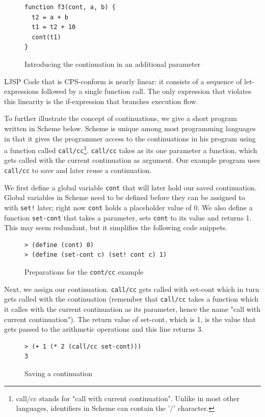 \documentclass[11pt]{report}
\begin{document}
\begin{figure}[ht]
\begin{lstlisting}
function f3(cont, a, b) {
  t2 = a + b
  t1 = t2 + 10
  cont(t1)
}
\end{lstlisting}
\caption{Introducing the continuation in an additional parameter}
\label{cpsconvfunc4}
\end{figure}

LJSP Code that is CPS-conform is nearly linear: it consists of a sequence of let-expressions followed by a single function call. The only expression that violates this linearity is the if-expression that branches execution flow.

To further illustrate the concept of continuations, we give a short program written in Scheme below. Scheme is unique among most programming languages in that it gives the programmer access to the continuations in his program using a function called \texttt{call/cc}\footnote{call/cc stands for "call with current continuation". Unlike in most other languages, identifiers in Scheme can contain the '/' character.}. \texttt{call/cc} takes as its one parameter a function, which gets called with the current continuation as argument. Our example program uses \texttt{call/cc} to save and later reuse a continuation.

We first define a global variable \texttt{cont} that will later hold our saved continuation. Global variables in Scheme need to be defined before they can be assigned to with \texttt{set!} later; right now \texttt{cont} holds a placeholder value of 0. We also define a function \texttt{set-cont} that takes a parameter, sets \texttt{cont} to its value and returns 1. This may seem redundant, but it simplifies the following code snippets.
\begin{figure}[ht]
\begin{lstlisting}
> (define (cont) 0)
> (define (set-cont c) (set! cont c) 1)
\end{lstlisting}
\caption{Preparations for the \texttt{cont/cc} example}
\label{contcc1}
\end{figure}

Next, we assign our continuation. \texttt{call/cc} gets called with set-cont which in turn gets called with the continuation (remember that \texttt{call/cc} takes a function which it calles with the current continuation as its parameter, hence the name "call with current continuation"). The return value of set-cont, which is 1, is the value that gets passed to the arithmetic operations and this line returns 3.
\begin{figure}[ht]
\begin{lstlisting}
> (+ 1 (* 2 (call/cc set-cont)))
3
\end{lstlisting}
\caption{Saving a continuation}
\label{contcc2}
\end{figure}
\end{document}
